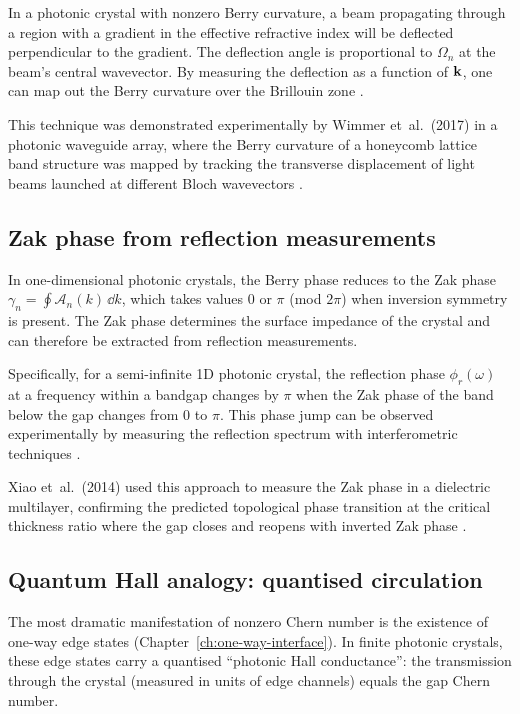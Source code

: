 In a photonic crystal with nonzero Berry curvature, a beam propagating
through a region with a gradient in the effective refractive index will
be deflected perpendicular to the gradient.  The deflection angle is
proportional to $\Omega_n$ at the beam's central wavevector.  By
measuring the deflection as a function of $\mathbf{k}$, one can map out
the Berry curvature over the Brillouin zone
\cite{chen2023berry,silveirinha2016bulk}.

This technique was demonstrated experimentally by Wimmer et~al.\
(2017) in a photonic waveguide array, where the Berry curvature of a
honeycomb lattice band structure was mapped by tracking the transverse
displacement of light beams launched at different Bloch wavevectors
\cite{wimmer2015observation}.

\subsection{Zak phase from reflection measurements}
\label{sec:ch5-zak-reflection}

In one-dimensional photonic crystals, the Berry phase reduces to the
Zak phase $\gamma_n=\oint\mathcal{A}_n(k)\,\dd k$, which takes values
$0$ or $\pi$ (mod $2\pi$) when inversion symmetry is present.  The
Zak phase determines the surface impedance of the crystal and can
therefore be extracted from reflection measurements.

Specifically, for a semi-infinite 1D photonic crystal, the reflection
phase $\phi_r(\omega)$ at a frequency within a bandgap changes by
$\pi$ when the Zak phase of the band below the gap changes from $0$
to $\pi$.  This phase jump can be observed experimentally by
measuring the reflection spectrum with interferometric techniques
\cite{atala2013direct,wang2007reflection}.

Xiao et~al.\ (2014) used this approach to measure the Zak phase
in a dielectric multilayer, confirming the predicted topological
phase transition at the critical thickness ratio where the gap
closes and reopens with inverted Zak phase
\cite{asbth2016berry,ozawa2018topological}.

\subsection{Quantum Hall analogy: quantised circulation}
\label{sec:ch5-quantised-circulation}

The most dramatic manifestation of nonzero Chern number is the
existence of one-way edge states (Chapter~\ref{ch:one-way-interface}).
In finite photonic crystals, these edge states carry a quantised
``photonic Hall conductance'': the transmission through the crystal
(measured in units of edge channels) equals the gap Chern number.

